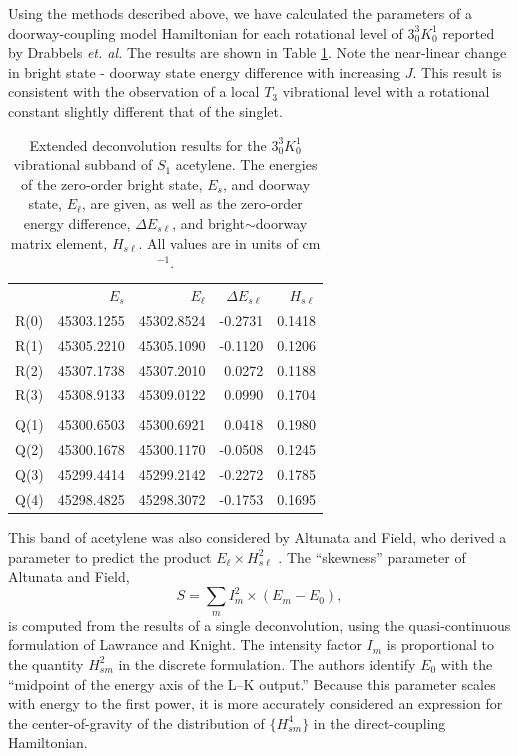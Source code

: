 Using the methods described above, we have calculated the parameters
of a doorway-coupling model Hamiltonian for each rotational level of
$3^3_0K^1_0$ reported by Drabbels \emph{et. al.}  The results are
shown in Table \ref{table:drabbels-deconv}.  Note the near-linear
change in bright state - doorway state energy difference with
increasing $J$.  This result is consistent with the observation of a
local $T_3$ vibrational level with a rotational constant slightly
different that of the singlet.

\begin{table}
  \caption{Extended deconvolution results for the $3^3_0K^1_0$
    vibrational subband of $S_1$ acetylene.  The energies of 
    the zero-order bright state, $E_s$, and doorway state, $E_{\ell}$, 
    are given, as well as the zero-order energy difference, $\Delta
    E_{s\ell}$, and bright$\sim$doorway matrix element, $H_{s\ell}$.
    All values are in units of cm$^{-1}$.}
  \label{table:drabbels-deconv}
  \centering
  \begin{tabular}{lrrrr}
    & \\
    \toprule
    & $E_s$ & $E_{\ell}$ & $\Delta E_{s\ell}$ & $H_{s\ell}$ \\
    \midrule
    R(0) & 45303.1255 & 45302.8524 & -0.2731 & 0.1418 \\
    R(1) & 45305.2210 & 45305.1090 & -0.1120 & 0.1206 \\
    R(2) & 45307.1738 & 45307.2010 &  0.0272 & 0.1188 \\
    R(3) & 45308.9133 & 45309.0122 &  0.0990 & 0.1704 \\
    & \\
    Q(1) & 45300.6503 & 45300.6921 &  0.0418 & 0.1980 \\
    Q(2) & 45300.1678 & 45300.1170 & -0.0508 & 0.1245 \\
    Q(3) & 45299.4414 & 45299.2142 & -0.2272 & 0.1785 \\
    Q(4) & 45298.4825 & 45298.3072 & -0.1753 & 0.1695 \\
    \bottomrule
  \end{tabular}
\end{table}

This band of acetylene was also considered by Altunata and Field, who
derived a parameter to predict the product $E_{\ell} \times
H_{s\ell}^2$ \cite{altunata01}.  The ``skewness'' parameter of
Altunata and Field,
\begin{equation}
  S = \sum_m I_m^2 \times (E_m - E_0),
\end{equation}
is computed from the results of a single deconvolution, using the
quasi-continuous formulation of Lawrance and Knight.  The intensity
factor $I_m$ is proportional to the quantity $H_{sm}^2$ in the
discrete formulation.  The authors identify $E_0$ with the ``midpoint
of the energy axis of the L–K output.''  Because this parameter scales
with energy to the first power, it is more accurately considered an
expression for the center-of-gravity of the distribution of $\lbrace
H_{sm}^4\rbrace$ in the direct-coupling Hamiltonian.

